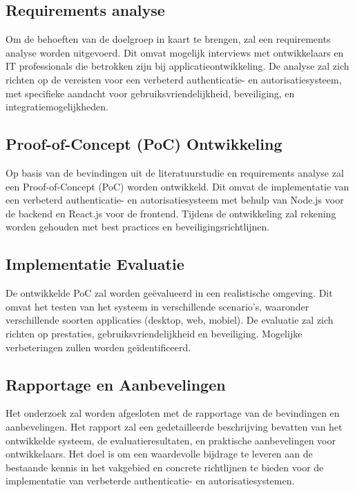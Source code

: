 \subsection{Requirements analyse}

Om de behoeften van de doelgroep in kaart te brengen, zal een requirements analyse worden uitgevoerd. Dit omvat mogelijk interviews met ontwikkelaars 
en IT professionals die betrokken zijn bij applicatieontwikkeling. De analyse zal zich richten op de vereisten voor een verbeterd authenticatie- en 
autorisatiesysteem, met specifieke aandacht voor gebruiksvriendelijkheid, beveiliging, en integratiemogelijkheden.

\subsection{Proof-of-Concept (PoC) Ontwikkeling}

Op basis van de bevindingen uit de literatuurstudie en requirements analyse zal een Proof-of-Concept (PoC) worden ontwikkeld. Dit omvat de implementatie 
van een verbeterd authenticatie- en autorisatiesysteem met behulp van Node.js voor de backend en React.js voor de frontend. Tijdens de ontwikkeling zal 
rekening worden gehouden met best practices en beveiligingsrichtlijnen.

\subsection{Implementatie Evaluatie}

De ontwikkelde PoC zal worden geëvalueerd in een realistische omgeving. Dit omvat het testen van het systeem in verschillende scenario's, waaronder 
verschillende soorten applicaties (desktop, web, mobiel). De evaluatie zal zich richten op prestaties, gebruiksvriendelijkheid en beveiliging. 
Mogelijke verbeteringen zullen worden geïdentificeerd.

\subsection{Rapportage en Aanbevelingen}

Het onderzoek zal worden afgesloten met de rapportage van de bevindingen en aanbevelingen. Het rapport zal een gedetailleerde beschrijving bevatten 
van het ontwikkelde systeem, de evaluatieresultaten, en praktische aanbevelingen voor ontwikkelaars. Het doel is om een waardevolle bijdrage te leveren 
aan de bestaande kennis in het vakgebied en concrete richtlijnen te bieden voor de implementatie van verbeterde authenticatie- en autorisatiesystemen.


